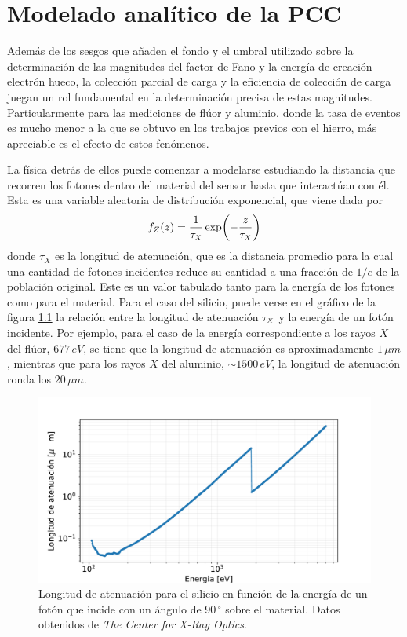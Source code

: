 \chapter{Modelado analítico de la PCC \label{chap:ModeloPCC}}
\noindent Además de los sesgos que añaden el fondo y el umbral utilizado sobre la determinación de las magnitudes del factor de Fano y la energía de creación electrón hueco, la colección parcial de carga y la eficiencia de colección de carga juegan un rol fundamental en la determinación precisa de estas magnitudes. Particularmente para las mediciones de flúor y aluminio, donde la tasa de eventos es mucho menor a la que se obtuvo en los trabajos previos\cite{TesisAndi,TesisKevin,Rodrigues} con el hierro, más apreciable es el efecto de estos fenómenos.

La física detrás de ellos puede comenzar a modelarse estudiando la distancia que recorren los fotones dentro del material del sensor hasta que interactúan con él. Esta es una variable aleatoria de distribución exponencial, que viene dada por
\begin{equation*}
    f_{Z}(z) = \frac{1}{\tau_{\scaleto{X}{4pt}}}\exp(-\frac{z}{\tau_{\scaleto{X}{4pt}}})
\end{equation*}
donde $\tau_{X}$ es la longitud de atenuación, que es la distancia promedio para la cual una cantidad de fotones incidentes reduce su cantidad a una fracción de $1/e$ de la población original. Este es un valor tabulado tanto para la energía de los fotones como para el material. Para el caso del silicio, puede verse en el gráfico de la figura \ref{fig:Attenuation} la relación entre la longitud de atenuación $\tau_{\scaleto{X}{4pt}}$ y la energía de un fotón incidente. Por ejemplo, para el caso de la energía correspondiente a los rayos $X$ del flúor, $677\,\si{eV}$, se tiene que la longitud de atenuación es aproximadamente $1\,\si{\mu m}$, mientras que para los rayos $X$ del aluminio, $\sim 1500\,\si{eV}$, la longitud de atenuación ronda los $20\,\si{\mu m}$.
\begin{figure}[h]
    \centering
        \includegraphics[scale=0.5]{Figs/AttenuationLength.pdf}
    \caption{\footnotesize{Longitud de atenuación para el silicio en función de la energía de un fotón que incide con un ángulo de $90\,^{\circ}$ sobre el material. Datos obtenidos de \textit{The Center for X-Ray Optics}\cite{AttenuationLength}.}}
    \label{fig:Attenuation}
\end{figure}

